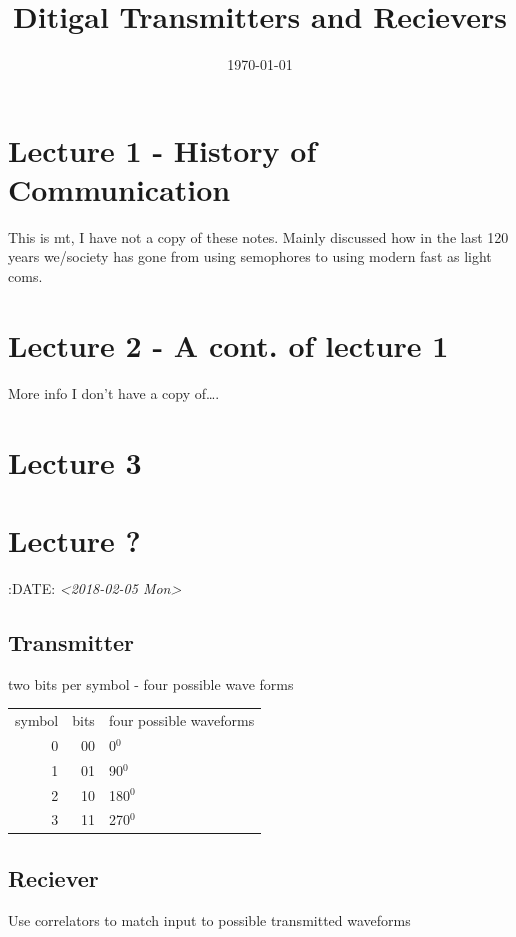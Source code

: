 \documentclass[11pt]{article}
\date{\today}
\title{Ditigal Transmitters and Recievers}
\begin{document}
\maketitle
\tableofcontents

\section{Lecture 1 - History of Communication}
\label{sec-1}
This is mt, I have not a copy of these notes. Mainly discussed how in the last 120 years we/society has gone from using semophores to using modern fast as light coms.
\section{Lecture 2 - A cont. of lecture 1}
\label{sec-2}
More info I don't have a copy of\ldots{}.
\section{Lecture 3}
\label{sec-3}

\section{Lecture ?}
\label{sec-4}
:DATE: \textit{<2018-02-05 Mon>}



\subsection{Transmitter}
\label{sec-4-1}
two bits per symbol - four possible wave forms
\begin{center}
\begin{tabular}{rrl}
symbol & bits & four possible waveforms\\
0 & 00 & 0$^{\text{0}}$\\
1 & 01 & 90$^{\text{0}}$\\
2 & 10 & 180$^{\text{0}}$\\
3 & 11 & 270$^{\text{0}}$\\
\end{tabular}
\end{center}

\subsection{Reciever}
\label{sec-4-2}
Use correlators to match input to possible transmitted waveforms
\end{document}
